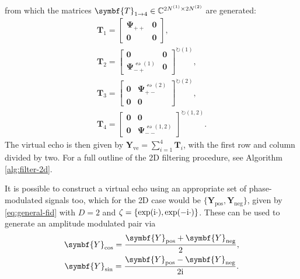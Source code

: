 from which the matrices $\symbf{T}_{1 \rightarrow 4} \in \mathbb{C}^{2 \None
\times 2 \Ntwo}$ are generated:
\begin{subequations}
    \begin{gather}
        \symbf{T}_1 =
        \begin{bmatrix}
            \symbf{\Psi}_{++} & \symbf{0} \\
            \symbf{0} & \symbf{0}
        \end{bmatrix}, \\
        \symbf{T}_2 =
        \begin{bmatrix}
            \symbf{0} & \symbf{0} \\
            \symbf{\Psi}_{-+}^{\leftrightsquigarrow (1)} & \symbf{0}
        \end{bmatrix}^{\circlearrowright (1)}, \\
        \symbf{T}_3 =
        \begin{bmatrix}
            \symbf{0} & \symbf{\Psi}_{+-}^{\leftrightsquigarrow (2)} \\
            \symbf{0} & \symbf{0}
        \end{bmatrix}^{\circlearrowright (2)}, \\
        \symbf{T}_4 =
        \begin{bmatrix}
            \symbf{0} & \symbf{0} \\
            \symbf{0} & \symbf{\Psi}_{--}^{\leftrightsquigarrow (1,2)}
        \end{bmatrix}^{\circlearrowright (1,2)}.
    \end{gather}
\end{subequations}
The virtual echo is then given by $\symbf{Y}_{\text{ve}} = \sum_{i=1}^4
\symbf{T}_i$, with the first row and column divided by two. For a full outline
of the 2D filtering procedure, see Algorithm \ref{alg:filter-2d}.

It is possible to construct a virtual echo using an appropriate set of
phase-modulated signals too, which for the \ac{2D} case would be $\lbrace
\symbf{Y}_{\text{pos}}, \symbf{Y}_{\text{neg}}\rbrace$, given by
\eqref{eq:general-fid} with $D=2$ and  $\zeta = \lbrace \exp(\mathrm{i} \cdot),
\exp(-\mathrm{i}\cdot)\rbrace$. These can be used to generate an amplitude modulated pair via
\begin{subequations}
    \begin{gather}
        \symbf{Y}_{\text{cos}} = \frac{\symbf{Y}_{\text{pos}} + \symbf{Y}_{\text{neg}}}{2},\\
        \symbf{Y}_{\text{sin}} = \frac{\symbf{Y}_{\text{pos}} - \symbf{Y}_{\text{neg}}}{2\iu}.
    \end{gather}
\end{subequations}


